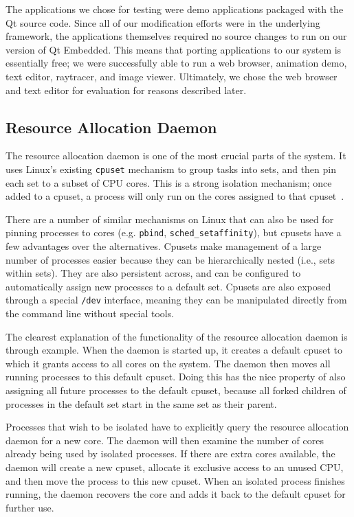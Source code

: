 \documentclass[letterpaper,twocolumn,11pt]{article}
\begin{document}
The applications we chose for testing were demo applications packaged with the Qt source code. Since all of our modification efforts were in the underlying framework, the applications themselves required no source changes to run on our version of Qt Embedded. This means that porting applications to our system is essentially free; we were successfully able to run a web browser, animation demo, text editor, raytracer, and image viewer. Ultimately, we chose the web browser and text editor for evaluation for reasons described later.

\subsection{Resource Allocation Daemon}

The resource allocation daemon is one of the most crucial parts of the system. It uses Linux's existing {\tt cpuset} mechanism to group tasks into sets, and then pin each set to a subset of CPU cores. This is a strong isolation mechanism; once added to a cpuset, a process will only run on the cores assigned to that cpuset~\cite{cpusets}.

There are a number of similar mechanisms on Linux that can also be used for pinning processes to cores (e.g. {\tt pbind}, {\tt sched\_setaffinity}), but cpusets have a few advantages over the alternatives. Cpusets make management of a large number of processes easier because they can be hierarchically nested (i.e., sets within sets). They are also persistent across, and can be configured to automatically assign new processes to a default set. Cpusets are also exposed through a special {\tt /dev} interface, meaning they can be manipulated directly from the command line without special tools.

The clearest explanation of the functionality of the resource allocation daemon is through example. When the daemon is started up, it creates a default cpuset to which it grants access to all cores on the system. The daemon then moves all running processes to this default cpuset. Doing this has the nice property of also assigning all future processes to the default cpuset, because all forked children of processes in the default set start in the same set as their parent.

Processes that wish to be isolated have to explicitly query the resource allocation daemon for a new core. The daemon will then examine the number of cores already being used by isolated processes. If there are extra cores available, the daemon will create a new cpuset, allocate it exclusive access to an unused CPU, and then move the process to this new cpuset. When an isolated process finishes running, the daemon recovers the core and adds it back to the default cpuset for further use.
\end{document}

